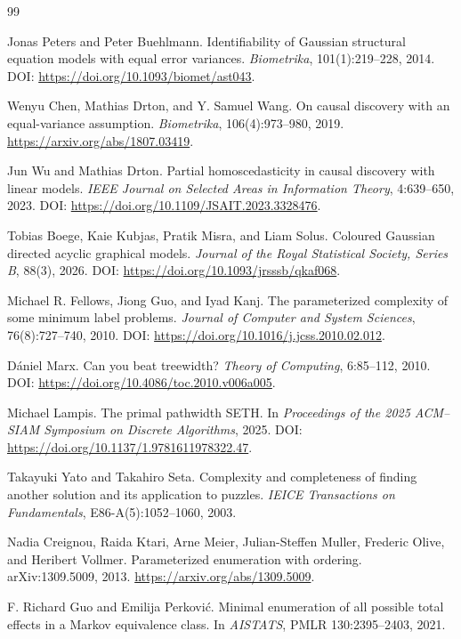 \documentclass{article}
\begin{document}
\begin{thebibliography}{99}

   Jonas Peters and Peter Buehlmann. Identifiability of Gaussian structural equation models with equal error variances. \emph{Biometrika}, 101(1):219--228, 2014. DOI: \url{https://doi.org/10.1093/biomet/ast043}.

   Wenyu Chen, Mathias Drton, and Y. Samuel Wang. On causal discovery with an equal-variance assumption. \emph{Biometrika}, 106(4):973--980, 2019. \url{https://arxiv.org/abs/1807.03419}.

   Jun Wu and Mathias Drton. Partial homoscedasticity in causal discovery with linear models. \emph{IEEE Journal on Selected Areas in Information Theory}, 4:639--650, 2023. DOI: \url{https://doi.org/10.1109/JSAIT.2023.3328476}.

   Tobias Boege, Kaie Kubjas, Pratik Misra, and Liam Solus. Coloured Gaussian directed acyclic graphical models. \emph{Journal of the Royal Statistical Society, Series B}, 88(3), 2026. DOI: \url{https://doi.org/10.1093/jrsssb/qkaf068}.

   Michael R. Fellows, Jiong Guo, and Iyad Kanj. The parameterized complexity of some minimum label problems. \emph{Journal of Computer and System Sciences}, 76(8):727--740, 2010. DOI: \url{https://doi.org/10.1016/j.jcss.2010.02.012}.

   D\'aniel Marx. Can you beat treewidth? \emph{Theory of Computing}, 6:85--112, 2010. DOI: \url{https://doi.org/10.4086/toc.2010.v006a005}.

   Michael Lampis. The primal pathwidth SETH. In \emph{Proceedings of the 2025 ACM--SIAM Symposium on Discrete Algorithms}, 2025. DOI: \url{https://doi.org/10.1137/1.9781611978322.47}.

   Takayuki Yato and Takahiro Seta. Complexity and completeness of finding another solution and its application to puzzles. \emph{IEICE Transactions on Fundamentals}, E86-A(5):1052--1060, 2003.

   Nadia Creignou, Raida Ktari, Arne Meier, Julian-Steffen Muller, Frederic Olive, and Heribert Vollmer. Parameterized enumeration with ordering. arXiv:1309.5009, 2013. \url{https://arxiv.org/abs/1309.5009}.

   F. Richard Guo and Emilija Perkovi\'c. Minimal enumeration of all possible total effects in a Markov equivalence class. In \emph{AISTATS}, PMLR 130:2395--2403, 2021.


\end{thebibliography}
\end{document}
